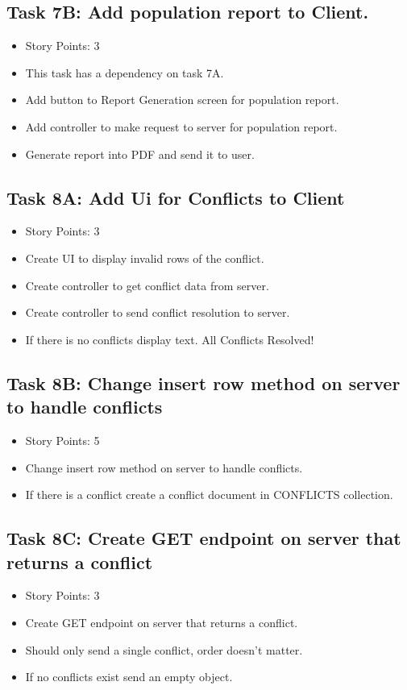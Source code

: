 \documentclass[12pt]{article}
\begin{document}
\subsection{Task 7B: Add population report to Client.}
\begin{itemize}%
\item Story Points: 3
\item This task has a dependency on task 7A.
\item Add button to Report Generation screen for population report.
\item Add controller to make request to server for population report.
\item Generate report into PDF and send it to user.
\end{itemize}

\subsection{Task 8A: Add Ui for Conflicts to Client}
\begin{itemize}%
\item Story Points: 3
\item Create UI to display invalid rows of the conflict.
\item Create controller to get conflict data from server.
\item Create controller to send conflict resolution to server.
\item If there is no conflicts display text. All Conflicts Resolved!
\end{itemize}


\subsection{Task 8B: Change insert row method on server to handle conflicts}
\begin{itemize}%
\item Story Points: 5
\item Change insert row method on server to handle conflicts.
\item If there is a conflict create a conflict document in CONFLICTS collection.
\end{itemize}

\subsection{Task 8C: Create GET endpoint on server that returns a conflict}
\begin{itemize}%
\item Story Points: 3
\item Create GET endpoint on server that returns a conflict.
\item Should only send a single conflict, order doesn't matter.
\item If no conflicts exist send an empty object.
\end{itemize}
\end{document}
